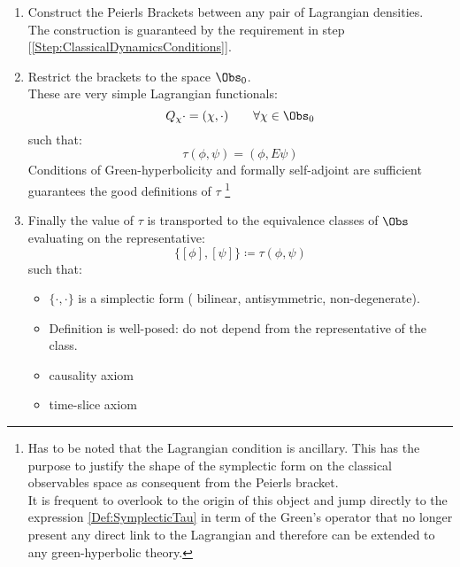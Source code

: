\documentclass[Main]{subfiles}
\begin{document}
   				   	\begin{enumerate}
   						\item Construct the Peierls Brackets between any pair of Lagrangian densities.\\
   							The construction is guaranteed by the requirement in step [\ref{Step:ClassicalDynamicsConditions}].
   						\item Restrict the brackets to the space $\Obs_0$.\\
   							These are very simple Lagrangian functionals:
   							\begin{displaymath}
   								Q_\chi \cdot = (\chi, \cdot) \qquad \forall \chi \in \Obs_0
   							\end{displaymath}
							such that:
							\begin{equation}\label{Def:SymplecticTau}
								\tau ( \phi, \psi) = ( \phi, E \psi)
							\end{equation}
							Conditions of Green-hyperbolicity and formally self-adjoint are sufficient guarantees the good definitions of $\tau$
							\footnote{Has to be noted that the Lagrangian condition is ancillary. This has the purpose to justify the shape of the symplectic form on the classical observables space as consequent from the Peierls bracket.
		\\
	It is frequent\cite{Dewitt1999}\cite{Benini} to overlook to the origin of this object and jump directly to the expression \ref{Def:SymplecticTau}  in term of the Green's operator that no longer present any direct link to the Lagrangian and therefore can be extended to any green-hyperbolic theory.}
						\item Finally the value of $\tau$ is transported to the equivalence classes of $\Obs$ evaluating on the representative:
							\begin{equation}
								\{ [\phi], [\psi]\} \coloneqq \tau(\phi, \psi)
							\end{equation}
							such that:
							\begin{itemize}
								\item $\{\cdot,\cdot\}$ is a simplectic form ( bilinear, antisymmetric, non-degenerate).
								\item Definition is well-posed: do not depend from the representative of the class.
								\item causality axiom
								\item time-slice axiom
							\end{itemize}
   					\end{enumerate}
\end{document}
